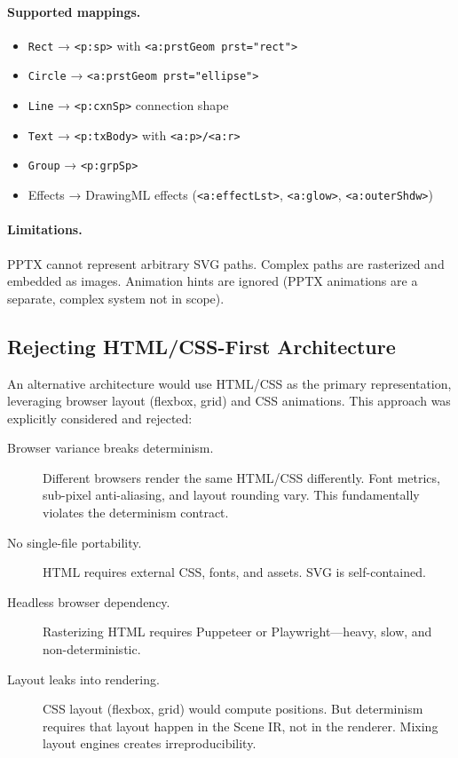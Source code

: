 \paragraph{Supported mappings.}
\begin{itemize}
  \item \texttt{Rect} → \texttt{<p:sp>} with \texttt{<a:prstGeom prst="rect">}
  \item \texttt{Circle} → \texttt{<a:prstGeom prst="ellipse">}
  \item \texttt{Line} → \texttt{<p:cxnSp>} connection shape
  \item \texttt{Text} → \texttt{<p:txBody>} with \texttt{<a:p>/<a:r>}
  \item \texttt{Group} → \texttt{<p:grpSp>}
  \item Effects → DrawingML effects (\texttt{<a:effectLst>}, \texttt{<a:glow>}, \texttt{<a:outerShdw>})
\end{itemize}

\paragraph{Limitations.}
PPTX cannot represent arbitrary SVG paths. Complex paths are rasterized and embedded as images. Animation hints are ignored (PPTX animations are a separate, complex system not in scope).

\subsection{Rejecting HTML/CSS-First Architecture}

An alternative architecture would use HTML/CSS as the primary representation, leveraging browser layout (flexbox, grid) and CSS animations. This approach was explicitly considered and rejected:

\begin{description}
  \item[Browser variance breaks determinism.] Different browsers render the same HTML/CSS differently. Font metrics, sub-pixel anti-aliasing, and layout rounding vary. This fundamentally violates the determinism contract.
  
  \item[No single-file portability.] HTML requires external CSS, fonts, and assets. SVG is self-contained.
  
  \item[Headless browser dependency.] Rasterizing HTML requires Puppeteer or Playwright---heavy, slow, and non-deterministic.
  
  \item[Layout leaks into rendering.] CSS layout (flexbox, grid) would compute positions. But determinism requires that layout happen in the Scene IR, not in the renderer. Mixing layout engines creates irreproducibility.
\end{description}

